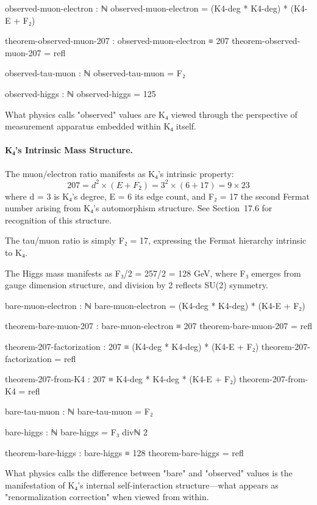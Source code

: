 \documentclass[11pt,a4paper]{book}
\begin{document}
\begin{code}
observed-muon-electron : ℕ
observed-muon-electron = (K4-deg * K4-deg) * (K4-E + F₂)

theorem-observed-muon-207 : observed-muon-electron ≡ 207
theorem-observed-muon-207 = refl

observed-tau-muon : ℕ
observed-tau-muon = F₂

observed-higgs : ℕ
observed-higgs = 125

\end{code}

What physics calls "observed" values are K₄ viewed through the perspective of measurement apparatus embedded within K₄ itself.

\paragraph{K₄'s Intrinsic Mass Structure.}
The muon/electron ratio manifests as K₄'s intrinsic property:
\[
207 = d^2 \times (E + F_2) = 3^2 \times (6 + 17) = 9 \times 23
\]
where d = 3 is K₄'s degree, E = 6 its edge count, and F₂ = 17 the second Fermat number arising from K₄'s automorphism structure. See Section~17.6 for recognition of this structure.

The tau/muon ratio is simply F₂ = 17, expressing the Fermat hierarchy intrinsic to K₄.

The Higgs mass manifests as F₃/2 = 257/2 = 128 GeV, where F₃ emerges from gauge dimension structure, and division by 2 reflects SU(2) symmetry.

\begin{code}
bare-muon-electron : ℕ
bare-muon-electron = (K4-deg * K4-deg) * (K4-E + F₂)

theorem-bare-muon-207 : bare-muon-electron ≡ 207
theorem-bare-muon-207 = refl

theorem-207-factorization : 207 ≡ (K4-deg * K4-deg) * (K4-E + F₂)
theorem-207-factorization = refl

theorem-207-from-K4 : 207 ≡ K4-deg * K4-deg * (K4-E + F₂)
theorem-207-from-K4 = refl

bare-tau-muon : ℕ
bare-tau-muon = F₂

bare-higgs : ℕ
bare-higgs = F₃ divℕ 2

theorem-bare-higgs : bare-higgs ≡ 128
theorem-bare-higgs = refl

\end{code}

What physics calls the difference between "bare" and "observed" values is the manifestation of K₄'s internal self-interaction structure—what appears as "renormalization correction" when viewed from within.
\end{document}

